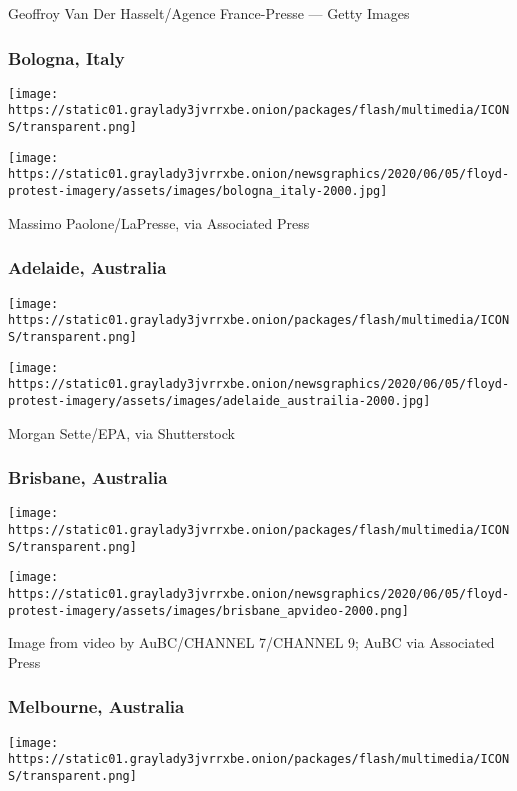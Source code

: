 Geoffroy Van Der Hasselt/Agence France-Presse --- Getty Images

\hypertarget{bologna-italy}{%
\subsubsection{Bologna, Italy}\label{bologna-italy}}

\texttt{[image: https://static01.graylady3jvrrxbe.onion/packages/flash/multimedia/ICONS/transparent.png]}

\texttt{[image: https://static01.graylady3jvrrxbe.onion/newsgraphics/2020/06/05/floyd-protest-imagery/assets/images/bologna\_italy-2000.jpg]}

Massimo Paolone/LaPresse, via Associated Press

\hypertarget{adelaide-australia}{%
\subsubsection{Adelaide, Australia}\label{adelaide-australia}}

\texttt{[image: https://static01.graylady3jvrrxbe.onion/packages/flash/multimedia/ICONS/transparent.png]}

\texttt{[image: https://static01.graylady3jvrrxbe.onion/newsgraphics/2020/06/05/floyd-protest-imagery/assets/images/adelaide\_austrailia-2000.jpg]}

Morgan Sette/EPA, via Shutterstock

\hypertarget{brisbane-australia}{%
\subsubsection{Brisbane, Australia}\label{brisbane-australia}}

\texttt{[image: https://static01.graylady3jvrrxbe.onion/packages/flash/multimedia/ICONS/transparent.png]}

\texttt{[image: https://static01.graylady3jvrrxbe.onion/newsgraphics/2020/06/05/floyd-protest-imagery/assets/images/brisbane\_apvideo-2000.png]}

Image from video by AuBC/CHANNEL 7/CHANNEL 9; AuBC via Associated Press

\hypertarget{melbourne-australia}{%
\subsubsection{Melbourne, Australia}\label{melbourne-australia}}

\texttt{[image: https://static01.graylady3jvrrxbe.onion/packages/flash/multimedia/ICONS/transparent.png]}

